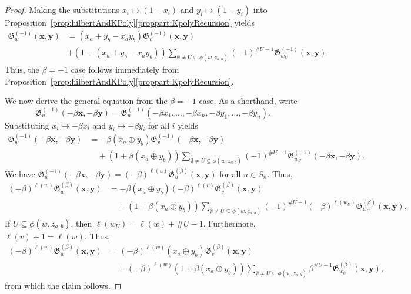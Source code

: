 \documentclass[12pt,reqno]{amsart}
\newtheorem{Main Conjecture}[theorem]{Main Conjecture}
\theoremstyle{remark}
\theoremstyle{plain}
\begin{document}
\begin{proof}
  Making the substitutions $x_i\mapsto (1-x_i)$ and $y_i\mapsto (1-y_i)$ into  Proposition~\ref{prop:hilbertAndKPoly}\ref{proppart:KpolyRecursion} yields
\begin{align*}
    \mathfrak G^{(-1)}_w(\mathbf x,\mathbf y)&=(x_a+ y_b-x_ay_b) \mathfrak G_v^{(-1)}(\mathbf x,\mathbf y)\\&+(1-(x_a+ y_b-x_ay_b))\sum_{ \emptyset \neq U\subseteq \phi(w,z_{a,b})}(-1)^{\#U-1}\mathfrak G_{w_U}^{(-1)}(\mathbf x,\mathbf y).
\end{align*}
Thus, the $\beta=-1$ case follows immediately from Proposition~\ref{prop:hilbertAndKPoly}\ref{proppart:KpolyRecursion}.

We now derive the general equation from the $\beta=-1$ case. As a shorthand, write \[\mathfrak G^{(-1)}_u(-\beta\mathbf x,-\beta \mathbf y)=\mathfrak G^{(-1)}_u(-\beta x_1,\ldots, -\beta x_n,-\beta y_1,\ldots,-\beta y_n).\] Substituting $x_i\mapsto -\beta x_i$ and $y_i\mapsto -\beta y_i$ for all $i$  yields
\begin{align*}
 \mathfrak G^{(-1)}_w(-\beta\mathbf x,-\beta\mathbf y)&=-\beta(x_a\oplus y_b)\mathfrak G_v^{(-1)}(-\beta\mathbf x,-\beta\mathbf y)\\
    &\quad +(1+\beta(x_a\oplus y_b))\sum_{ \emptyset \neq U\subseteq \phi(w,z_{a,b})}(-1)^{\#U-1}\mathfrak G_{w_U}^{(-1)}(-\beta\mathbf x,-\beta\mathbf y).
\end{align*}
We have $\mathfrak G^{(-1)}_u(-\beta\mathbf x,-\beta \mathbf y)=(-\beta)^{\ell(u)}\mathfrak G^{(\beta)}_u(\mathbf x,\mathbf y)$ for all $u\in S_n$. Thus, 
\begin{align*}
    (-\beta)^{\ell(w)}\mathfrak G^{(\beta)}_w(\mathbf x,\mathbf y)&=-\beta(x_a\oplus y_b) (-\beta)^{\ell(v)}\mathfrak G_v^{(\beta)}(\mathbf x,\mathbf y)\\
    &\quad +(1+\beta(x_a\oplus y_b))\sum_{ \emptyset \neq U\subseteq \phi(w,z_{a,b})}(-1)^{\#U-1}(-\beta)^{\ell(w_U)}\mathfrak G_{w_U}^{(\beta)}(\mathbf x,\mathbf y).
\end{align*}
 If $U\subseteq \phi(w,z_{a,b})$, then $\ell(w_U)=\ell(w)+\#U-1$. Furthermore, $\ell(v)+1=\ell(w)$.  Thus, 
\begin{align*}
    (-\beta)^{\ell(w)}\mathfrak G^{(\beta)}_w(\mathbf x,\mathbf y)&=(-\beta)^{\ell(w)}(x_a\oplus y_b) \mathfrak G_v^{(\beta)}(\mathbf x,\mathbf y)\\
    &\quad +(-\beta)^{\ell(w)}(1+\beta(x_a\oplus y_b))\sum_{ \emptyset \neq U\subseteq \phi(w,z_{a,b})}\beta^{\#U-1}\mathfrak G_{w_U}^{(\beta)}(\mathbf x,\mathbf y),
\end{align*}
from which the claim follows.
\end{proof}
\end{document}
